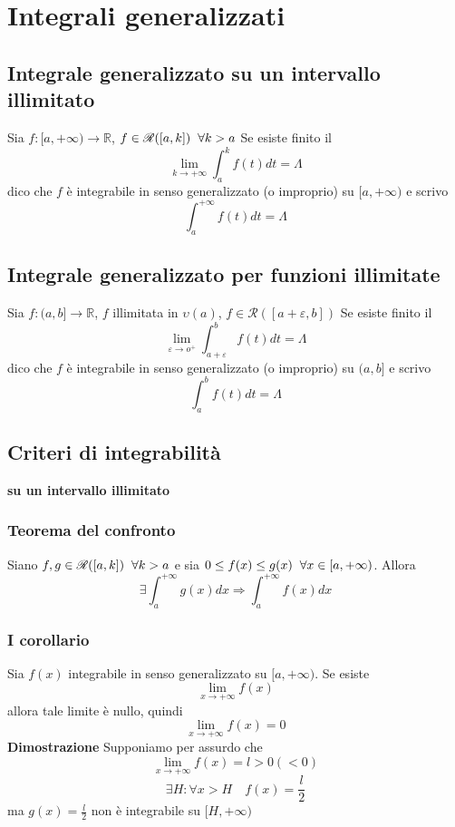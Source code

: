 \documentclass[12pt]{article}
\begin{document}
\section{Integrali generalizzati}

\subsection{Integrale generalizzato su un intervallo illimitato}
Sia $f: [a, +\infty) \to \mathbb{R}$, $f \in \mathscr{R} ([a,k]) \hspace*{0.2cm} \forall k>a$
Se esiste finito il 
\[ \lim_{k \to +\infty} \int_a^k f(t) dt = \Lambda \] dico che $f$ è integrabile in senso generalizzato (o improprio) su $[a, +\infty)$ e scrivo 
\[ \int_a^{+\infty} f(t)dt = \Lambda \]

\subsection{Integrale generalizzato per funzioni illimitate}
Sia $f: (a, b] \to \mathbb{R}$, $f$ illimitata in $\upsilon (a)$, $f \in \mathscr{R} ([a+\varepsilon, b])$ Se esiste finito il 
\[ \lim_{\varepsilon \to o^+} \int_{a +\varepsilon}^b f(t) dt = \Lambda\] 
dico che $f$ è integrabile in senso generalizzato (o improprio) su $(a,b]$ e scrivo
\[ \int_a^b f(t) dt = \Lambda \]

\subsection{Criteri di integrabilità}
\textbf{su un intervallo illimitato}
\subsubsection{Teorema del confronto}
Siano $f, g \in \mathscr{R}([a,k]) \hspace*{0.2cm} \forall k>a$ e sia $0 \leq f(x) \leq g(x) \hspace*{0.2cm} \forall x \in [a, +\infty )$. Allora
\[ \exists \int_a^{+\infty} g(x) dx \Rightarrow \int_a^{+\infty} f(x) dx\]
\subsubsection{I corollario}
Sia $f(x)$ integrabile in senso generalizzato su $[a, +\infty)$. Se esiste
\[ \lim_{x\to +\infty} f(x)\]
allora tale limite è nullo, quindi
\[\lim_{x\to +\infty} f(x) = 0 \]
\textbf{Dimostrazione}\newline
Supponiamo per assurdo che
\[\lim_{x\to +\infty} f(x) = l > 0 (<0)\]
\[\exists H : \forall x > H \quad f(x) = \frac{l}{2}\]
ma $g(x) = \frac{l}{2}$ non è integrabile su $[H, +\infty)$
\end{document}
